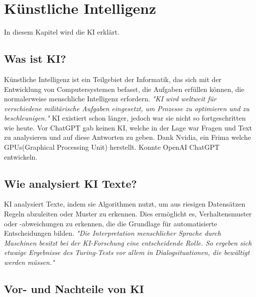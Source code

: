 \chapter{Künstliche Intelligenz}
\label{chap:ai}

In diesem Kapitel wird die KI erklärt.

\section{Was ist KI?}

Künstliche Intelligenz ist ein Teilgebiet der Informatik, das sich mit der Entwicklung von Computersystemen befasst, die Aufgaben erfüllen können, die normalerweise menschliche Intelligenz erfordern. \textit{"KI wird weltweit für verschiedene militärische Aufgaben eingesetzt, um Prozesse zu optimieren und zu beschleunigen." \citep{ethics-ai-wikipedia}}\newline
KI existiert schon länger, jedoch war sie nicht so fortgeschritten wie heute. Vor ChatGPT gab keinen KI, welche in der Lage war Fragen und Text zu analysieren und auf diese Antworten zu geben. Dank Nvidia, ein Frima welche GPUs(Graphical Processing Unit) herstellt. Konnte OpenAI ChatGPT entwickeln.

\section{Wie analysiert KI Texte?}

KI analysiert Texte, indem sie Algorithmen nutzt, um aus riesigen Datensätzen Regeln abzuleiten oder Muster zu erkennen. Dies ermöglicht es, Verhaltensmuster oder -abweichungen zu erkennen, die die Grundlage für automatisierte Entscheidungen bilden. \textit{"Die Interpretation menschlicher Sprache durch Maschinen besitzt bei der KI-Forschung eine entscheidende Rolle. So ergeben sich etwaige Ergebnisse des Turing-Tests vor allem in Dialogsituationen, die bewältigt werden müssen." \citep{ai-wikipedia}}

\section{Vor- und Nachteile von KI}

